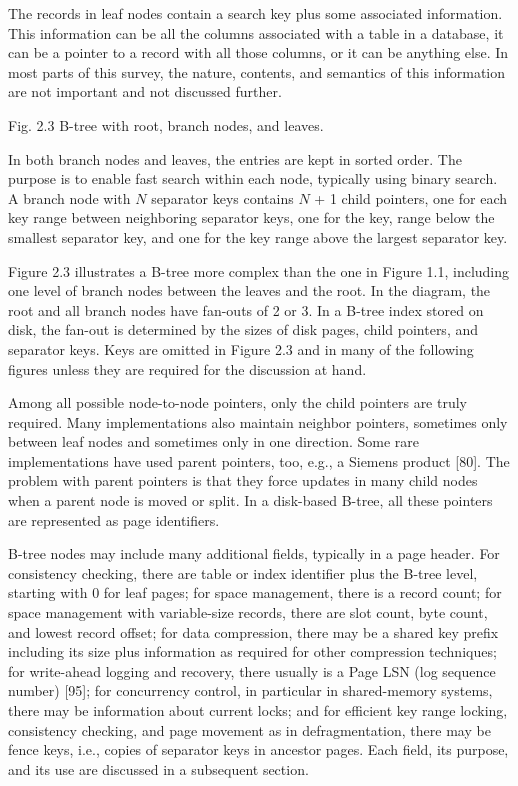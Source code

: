 The records in leaf nodes contain a search key plus some associated
information. This information can be all the columns associated with a
table in a database, it can be a pointer to a record with all those
columns, or it can be anything else. In most parts of this survey, the
nature, contents, and semantics of this information are not important
and not discussed further.

Fig. 2.3 B-tree with root, branch nodes, and leaves.

In both branch nodes and leaves, the entries are kept in sorted order.
The purpose is to enable fast search within each node, typically using
binary search. A branch node with $N$ separator keys contains
$N$ + 1 child pointers, one for each key range between neighboring
separator keys, one for the key, range below the smallest separator key,
and one for the key range above the largest separator key.

Figure 2.3 illustrates a B-tree more complex than the one in Figure 1.1,
including one level of branch nodes between the leaves and the root. In
the diagram, the root and all branch nodes have fan-outs of 2 or 3. In a
B-tree index stored on disk, the fan-out is determined by the sizes of
disk pages, child pointers, and separator keys. Keys are omitted in
Figure 2.3 and in many of the following figures unless they are required
for the discussion at hand.

Among all possible node-to-node pointers, only the child pointers are
truly required. Many implementations also maintain neighbor pointers,
sometimes only between leaf nodes and sometimes only in one direction.
Some rare implementations have used parent pointers, too, e.g., a
Siemens product {[}80{]}. The problem with parent pointers is that they
force updates in many child nodes when a parent node is moved or split.
In a disk-based B-tree, all these pointers are represented as page
identifiers.

B-tree nodes may include many additional fields, typically in a page
header. For consistency checking, there are table or index identifier
plus the B-tree level, starting with 0 for leaf pages; for space
management, there is a record count; for space management with
variable-size records, there are slot count, byte count, and lowest
record offset; for data compression, there may be a shared key prefix
including its size plus information as required for other compression
techniques; for write-ahead logging and recovery, there usually is a
Page LSN (log sequence number) {[}95{]}; for concurrency control, in
particular in shared-memory systems, there may be information about
current locks; and for efficient key range locking, consistency
checking, and page movement as in defragmentation, there may be fence
keys, i.e., copies of separator keys in ancestor pages. Each field, its
purpose, and its use are discussed in a subsequent section.

